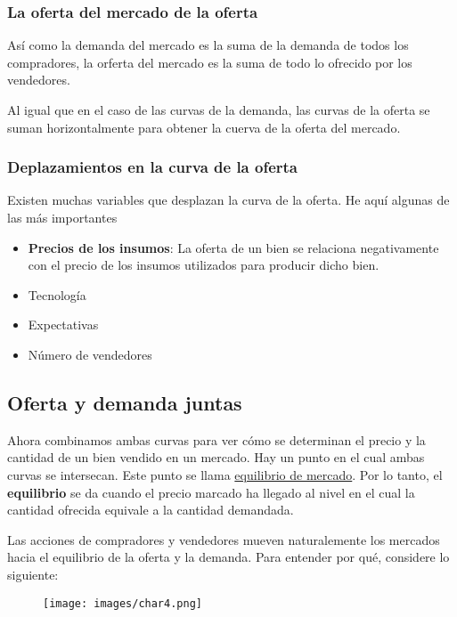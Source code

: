 \subsubsection{La oferta del mercado de la oferta}
Así como la demanda del mercado es la suma de la demanda de todos los compradores, la orferta del mercado es la suma de todo lo ofrecido por los vendedores.
\par Al igual que en el caso de las curvas de la demanda, las curvas de la oferta se suman horizontalmente para obtener la cuerva de la oferta del mercado.

\subsubsection{Deplazamientos en la curva de la oferta}
Existen muchas variables que desplazan la curva de la oferta. He aquí algunas de las más importantes

\begin{itemize}
\item{{\bf Precios de los insumos}: La oferta de un bien se relaciona negativamente con el precio de los insumos utilizados para producir dicho bien.}
\item{Tecnología}
\item{Expectativas}
\item{Número de vendedores}
\end{itemize}

\newpage

\subsection{Oferta y demanda juntas}
Ahora combinamos ambas curvas para ver cómo se determinan el precio y la cantidad de un bien vendido en un mercado.
Hay un punto en el cual ambas curvas se intersecan. Este punto se llama \underline{equilibrio de mercado}.
Por lo tanto, el \textbf{equilibrio} se da cuando el precio marcado ha llegado al nivel en el cual la cantidad ofrecida equivale a la cantidad demandada.

\par Las acciones de compradores y vendedores mueven naturalemente los mercados hacia el equilibrio de la oferta y la demanda. Para entender por qué, considere lo siguiente:


\begin{figure}[hbt!]
    \centering
    \texttt{[image: images/char4.png]}
\end{figure}